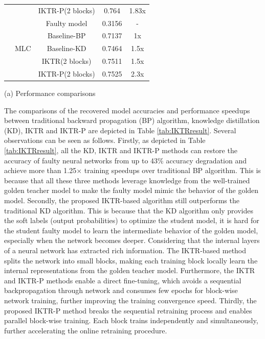 \begin{table}
\begin{tabular}{c|c|c|c|c}
        &                      & IKTR-P(2 blocks) & 0.764   & 1.83x   \\ \cline{2-5} 
        & \multirow{5}{*}{MLC} & Faulty model     & 0.3156   & -       \\
        &                      & Baseline-BP      & 0.7137   & 1x      \\
        &                      & Baseline-KD      & 0.7464   & 1.5x    \\
        &                      & IKTR(2 blocks)   & 0.7511   & 1.5x    \\
        &                      & IKTR-P(2 blocks) & 0.7525   & 2.3x    \\ \hline 
    \end{tabular}
    \vspace{-20pt}
\end{table}

(a) Performance comparisons


The comparisons of the recovered model accuracies and performance speedups between traditional backward propagation (BP) algorithm, knowledge distillation (KD), IKTR and IKTR-P are depicted in Table \ref{tab:IKTRresult}.
Several observations can be seen as follows. Firstly, as depicted in Table \ref{tab:IKTRresult}, all the KD, IKTR and IKTR-P methods can restore the accuracy of faulty neural networks from up to {43\%} accuracy degradation and achieve more than 1.25$\times$ training speedups over traditional BP algorithm. This is because that all these three methods leverage knowledge from the well-trained golden teacher model to make the faulty model mimic the behavior of the golden model. Secondly, the proposed IKTR-based algorithm
still outperforms the traditional KD algorithm. This is because that the KD algorithm only provides the soft labels (output probabilities) to optimize the student model, it is hard for the student faulty model to learn the intermediate behavior of the golden model, especially when the network
becomes deeper. Considering that the internal layers of a neural network has extracted rich information. The IKTR-based method splits the network into small blocks, making each training block locally learn the internal representations from the golden teacher model. Furthermore, the IKTR and IKTR-P methods enable a direct fine-tuning, which avoids a sequential backpropagation through network and consumes few epochs for block-wise network training, further improving the training convergence speed. Thirdly, the proposed IKTR-P method breaks the sequential retraining process and enables parallel block-wise training. Each block trains independently and simultaneously, further accelerating the online retraining procedure.

